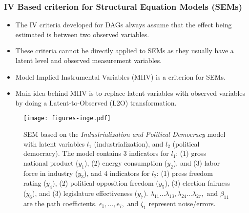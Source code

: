 \documentclass{beamer}
\begin{document}
\begin{frame}
	\frametitle{IV Based criterion for Structural Equation Models (SEMs)} 
		\begin{itemize}
		\item The IV criteria developed for DAGs always assume that the effect being estimated is between two observed variables.
		\item These criteria cannot be directly applied to SEMs as they usually have a latent level and observed measurement variables.
		\item Model Implied Instrumental Variables (MIIV) is a criterion for SEMs.
		\item Main idea behind MIIV is to replace latent variables with observed variables by doing a Latent-to-Observed (L2O) transformation.
	\end{itemize}
\begin{figure}
	\centering
	\texttt{[image: figures-inge.pdf]}
	\caption{\footnotesize SEM based on the \emph{Industrialization and
		 Political Democracy} model with latent
		 variables $ l_1 $ (industrialization), and $ l_2 $ (political democracy).
		 The model contains 3 indicators for $ l_1 $: (1) gross
		 national product ($ y_1 $), (2) energy consumption
		 ($ y_2 $), and (3) labor force in industry ($ y_3 $), and 4
		 indicators for $ l_2 $: (1) press freedom rating ($y_4$), (2)
		 political opposition freedom ($y_5$), (3) election fairness
		 ($y_6$), and (3) legislature effectiveness ($y_7$). $
		 \lambda_{11} \dots \lambda_{13}, \lambda_{24} \dots
		 \lambda_{27}, \text{ and } \beta_{11} $ are the path
		 coefficients. $ \epsilon_1, \dots, \epsilon_7, \text{ and }
		 \zeta_1 $ represent noise/errors.}
	\label{fig:example_sem}
\end{figure}
\end{frame}
\end{document}

